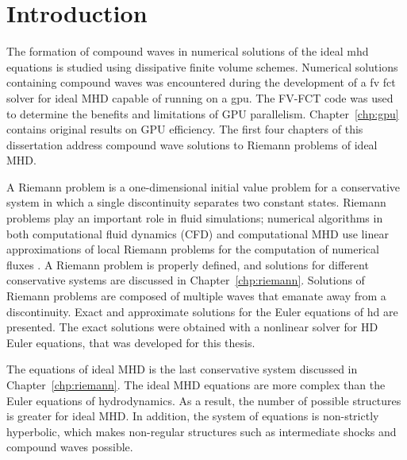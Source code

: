 %
%


\chapter[Introduction]{Introduction}
\label{chp:intro}

The formation of compound waves in numerical solutions of the ideal \gls{mhd} equations is studied using dissipative finite volume schemes.  Numerical solutions containing compound waves was encountered during the development of a \gls{fv} \gls{fct} solver for ideal MHD capable of running on a \gls{gpu}.  The FV-FCT code was used to determine the benefits and limitations of GPU parallelism.  Chapter~\ref{chp:gpu} contains original results on GPU efficiency.  The first four chapters of this dissertation address compound wave solutions to Riemann problems of ideal MHD. 

A Riemann problem is a one-dimensional initial value problem for a conservative system in which a single discontinuity separates two constant states.  Riemann problems play an important role in fluid simulations; numerical algorithms in both computational fluid dynamics (CFD) and computational MHD use linear approximations of local Riemann problems for the computation of numerical fluxes \citep{Brio:1988,Ryu:1995a}.  A Riemann problem is properly defined, and solutions for different conservative systems are discussed in Chapter~\ref{chp:riemann}.  Solutions of Riemann problems are composed of multiple waves that emanate away from a discontinuity.  Exact and approximate solutions for the Euler equations of \gls{hd} are presented.   The exact solutions were obtained with a nonlinear solver for HD Euler equations, that was developed for this thesis.

The equations of ideal MHD is the last conservative system discussed in Chapter~\ref{chp:riemann}.  The ideal MHD equations are more complex than the Euler equations of hydrodynamics. As a result, the number of possible structures is greater for ideal MHD.  In addition, the system of equations is non-strictly hyperbolic, which makes non-regular structures such as intermediate shocks and compound waves possible.  

